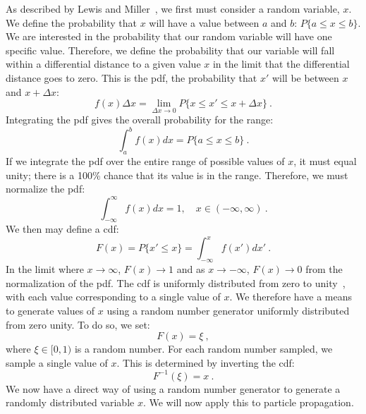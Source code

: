 As described by Lewis and Miller~\cite{lewis1993}, we first must
consider a random variable, $x$. We define the probability that $x$
will have a value between $a$ and $b$: $P\{a \leq x \leq b\}$. We
are interested in the probability that our random variable will have one
specific value. Therefore, we define the probability that our variable
will fall within a differential distance to a given value $x$ in the
limit that the differential distance goes to zero. This is the
\gls{pdf}, the probability that $x'$ will be between $x$ and $x +
\Delta x$:
\begin{equation}
  \label{eq:pdf_initial}
 f(x)\Delta x = \lim_{\Delta x \to 0}  P \{ x \leq x' \leq x + \Delta x \}\:.
\end{equation}
Integrating the \gls{pdf} gives the overall probability for the range:
\begin{equation}
\label{pdf}
  \int_a^bf(x)dx = P\{a \leq x \leq b\}\:.
\end{equation}
If we integrate the \gls{pdf} over the entire range of possible values
of $x$, it must equal unity; there is a 100\% chance that its value is
in the range. Therefore, we must normalize the \gls{pdf}:
\begin{equation*}
  \int_{-\infty}^{\infty}f(x)dx = 1, \quad x \in (-\infty,\infty)\:.
\end{equation*}
We then may define a \gls{cdf}:
\begin{equation}
  \label{eq:cdf}
  F(x) = P \{ x' \leq x\} = \int_{-\infty}^xf(x')dx'\:.
\end{equation}
In the limit where $x \to \infty$, $F(x) \to 1$ and as
$x \to -\infty$, $F(x) \to 0$ from the normalization of the
\gls{pdf}. The \gls{cdf} is uniformly distributed from zero to
unity~\cite{lewis1993}, with each value corresponding to a single
value of $x$. We therefore have a means to generate values of $x$
using a random number generator uniformly distributed from zero
unity. To do so, we set:
\begin{equation*}
  F(x) = \xi\:,
\end{equation*}
where $\xi \in [0,1)$ is a random number. For each random number
sampled, we sample a single value of $x$. This is determined by
inverting the \gls{cdf}:
\begin{equation}
  \label{eq:inverted_cdf}
  F^{-1}(\xi) = x\:.
\end{equation}
We now have a direct way of using a random number generator to
generate a randomly distributed variable $x$. We will now apply this
to particle propagation.

